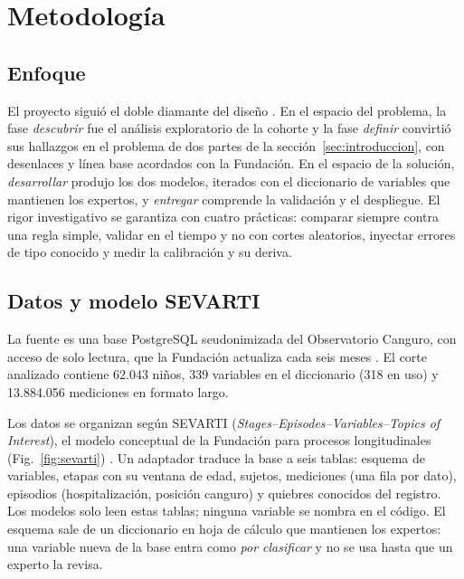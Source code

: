 \section{Metodología}
\label{sec:metodologia}

\subsection{Enfoque}
El proyecto siguió el doble diamante del diseño \cite{designcouncil2007,brown2008}. En el espacio del problema, la fase \emph{descubrir} fue el análisis exploratorio de la cohorte y la fase \emph{definir} convirtió sus hallazgos en el problema de dos partes de la sección~\ref{sec:introduccion}, con desenlaces y línea base acordados con la Fundación. En el espacio de la solución, \emph{desarrollar} produjo los dos modelos, iterados con el diccionario de variables que mantienen los expertos, y \emph{entregar} comprende la validación y el despliegue. El rigor investigativo se garantiza con cuatro prácticas: comparar siempre contra una regla simple, validar en el tiempo y no con cortes aleatorios, inyectar errores de tipo conocido y medir la calibración y su deriva.

\subsection{Datos y modelo SEVARTI}
\label{sec:datos}
La fuente es una base PostgreSQL seudonimizada del Observatorio Canguro, con acceso de solo lectura, que la Fundación actualiza cada seis meses \cite{fundacion2026}. El corte analizado contiene 62.043 niños, 339 variables en el diccionario (318 en uso) y 13.884.056 mediciones en formato largo.

Los datos se organizan según SEVARTI (\emph{Stages--Episodes--Variables--Topics of Interest}), el modelo conceptual de la Fundación para procesos longitudinales (Fig.~\ref{fig:sevarti}) \cite{fundacion2026}. Un adaptador traduce la base a seis tablas: esquema de variables, etapas con su ventana de edad, sujetos, mediciones (una fila por dato), episodios (hospitalización, posición canguro) y quiebres conocidos del registro. Los modelos solo leen estas tablas; ninguna variable se nombra en el código. El esquema sale de un diccionario en hoja de cálculo que mantienen los expertos: una variable nueva de la base entra como \emph{por clasificar} y no se usa hasta que un experto la revisa.

